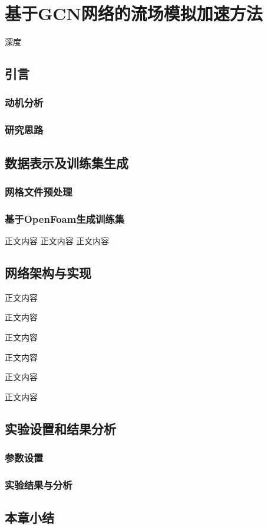 \chapter{基于GCN网络的流场模拟加速方法}
深度

\section{引言}

\subsection{动机分析}

\subsection{研究思路}

\section{数据表示及训练集生成}


\subsection{网格文件预处理}

\subsection{基于OpenFoam生成训练集}
正文内容
正文内容
正文内容



\section{网络架构与实现}
正文内容

正文内容



正文内容

正文内容

正文内容

正文内容

\section{实验设置和结果分析}

\subsection{参数设置}



\subsection{实验结果与分析}



\section{本章小结}

